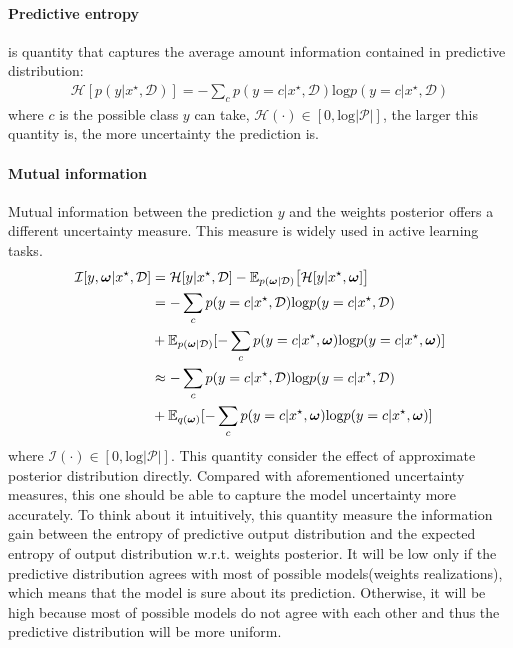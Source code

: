 \paragraph{Predictive entropy} is quantity that captures the average amount information contained in predictive distribution: 
\begin{equation}\label{entropy}	
\begin{aligned}
\mathcal H[p(y|x^\star, \mathcal D)] = -\sum_{c}p(y=c|x^\star, \mathcal D)\text{log}p(y=c|x^\star, \mathcal D)
\end{aligned}
\end{equation}
where $c$ is the possible class $y$ can take, $\mathcal H(\cdot) \in [0, \text{log}{|\mathcal P|}]$, the larger this quantity is, the more uncertainty the prediction is.

\paragraph{Mutual information}
Mutual information between the prediction $y$ and the weights posterior offers a different uncertainty measure. This measure is widely used in active learning tasks\cite{houlsby2011bayesian}.
\begin{equation}\label{mi}	
\begin{aligned}
\mathcal I[y,\boldsymbol \omega|x^\star, \mathcal D] &= \mathcal H[y|x^\star, \mathcal D] - \mathbb E_{p(\boldsymbol \omega| \mathcal D)}\big[\mathcal H[y|x^\star, \boldsymbol \omega] \big] \\
&= -\sum_{c}p(y=c|x^\star, \mathcal D)\text{log}p(y=c|x^\star, \mathcal D) \\ &+ \mathbb E_{p(\boldsymbol \omega|\mathcal D)}[-\sum_{c}p(y=c|x^\star, \boldsymbol \omega)\text{log}p(y=c|x^\star, \boldsymbol \omega)] \\
&\approx -\sum_{c}p(y=c|x^\star, \mathcal D)\text{log}p(y=c|x^\star, \mathcal D) \\ &+ \mathbb E_{q(\boldsymbol \omega)}[-\sum_{c}p(y=c|x^\star, \boldsymbol \omega)\text{log}p(y=c|x^\star, \boldsymbol \omega)]
\end{aligned}
\end{equation}
where $\mathcal I(\cdot) \in [0,\text{log}{|\mathcal P|}]$.
This quantity consider the effect of approximate posterior distribution directly. Compared with aforementioned uncertainty measures, this one should be able to capture the model uncertainty more accurately. To think about it intuitively, this quantity measure the information gain between the entropy of predictive output distribution and the expected entropy of output distribution w.r.t. weights posterior. It will be low only if the predictive distribution agrees with most of possible models(weights realizations), which means that the model is sure about its prediction. Otherwise, it will be high because most of possible models do not agree with each other and thus the predictive distribution will be more uniform.

